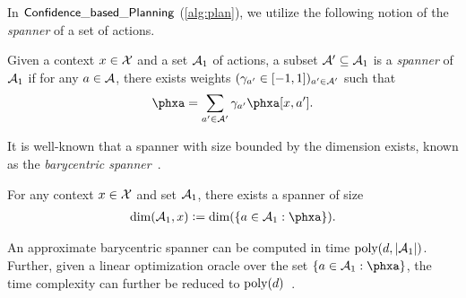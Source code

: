 
In $\mathsf{Confidence\_based\_Planning}$ (\cref{alg:plan}), we utilize the following notion of the \emph{spanner} of a set of actions.
\begin{definition}\label{def:spanner}
Given a context $x\in\mathcal{X}$ and a set $\mathcal{A}_1$ of actions, a subset $\mathcal{A}'\subseteq \mathcal{A}_1$ is a \emph{spanner} of $\mathcal{A}_1$ if for any $a\in\mathcal{A}$, there exists weights $(\gamma_{a'}\in[-1,1])_{a'\in\mathcal{A}'}$ such that
\begin{align*}
    \phxa=\sum_{a'\in\cA'} \gamma_{a'} \phxa[x,a'].
\end{align*}
\end{definition}

It is well-known that a spanner with size bounded by the dimension exists, known as the \emph{barycentric spanner}~\citep{awerbuch2008online}.
\begin{lemma}\label{lem:bary-spanner}
For any context $x\in\mathcal{X}$ and set $\mathcal{A}_1$, there exists a spanner of size
\begin{align*}
    \dim(\cA_1,x)\defeq \dim(\sset{a\in\cA_1: \phxa}).
\end{align*}
\end{lemma}
An approximate barycentric spanner can be computed in time $\mathrm{poly}(d,|\mathcal{A}_1|)$. Further, given a linear optimization oracle over the set $\sset{a\in\cA_1: \phxa}$, the time complexity can further be reduced to $\mathrm{poly}(d)$~\citep{hazan2016volumetric,perchet2016batched}.







